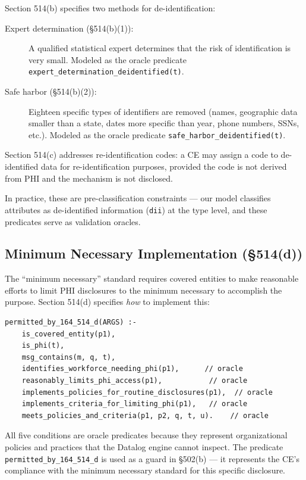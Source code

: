 \documentclass[11pt,letterpaper]{article}
\begin{document}
Section 514(b) specifies two methods for de-identification:

\begin{description}
  \item[Expert determination (\S 514(b)(1)):] A qualified statistical expert determines that the risk of identification is very small. Modeled as the oracle predicate \texttt{expert\_determination\_deidentified(t)}.
  \item[Safe harbor (\S 514(b)(2)):] Eighteen specific types of identifiers are removed (names, geographic data smaller than a state, dates more specific than year, phone numbers, SSNs, etc.). Modeled as the oracle predicate \texttt{safe\_harbor\_deidentified(t)}.
\end{description}

Section 514(c) addresses re-identification codes: a CE may assign a code to de-identified data for re-identification purposes, provided the code is not derived from PHI and the mechanism is not disclosed.

In practice, these are pre-classification constraints --- our model classifies attributes as de-identified information (\texttt{dii}) at the type level, and these predicates serve as validation oracles.

\subsection{Minimum Necessary Implementation (\S 514(d))}

The ``minimum necessary'' standard requires covered entities to make reasonable efforts to limit PHI disclosures to the minimum necessary to accomplish the purpose. Section 514(d) specifies \emph{how} to implement this:

\begin{lstlisting}[style=soufflestyle,caption={Minimum necessary implementation (\S 514(d))}]
permitted_by_164_514_d(ARGS) :-
    is_covered_entity(p1),
    is_phi(t),
    msg_contains(m, q, t),
    identifies_workforce_needing_phi(p1),      // oracle
    reasonably_limits_phi_access(p1),           // oracle
    implements_policies_for_routine_disclosures(p1),  // oracle
    implements_criteria_for_limiting_phi(p1),   // oracle
    meets_policies_and_criteria(p1, p2, q, t, u).    // oracle
\end{lstlisting}

All five conditions are oracle predicates because they represent organizational policies and practices that the Datalog engine cannot inspect. The predicate \texttt{permitted\_by\_164\_514\_d} is used as a guard in \S 502(b) --- it represents the CE's compliance with the minimum necessary standard for this specific disclosure.
\end{document}

